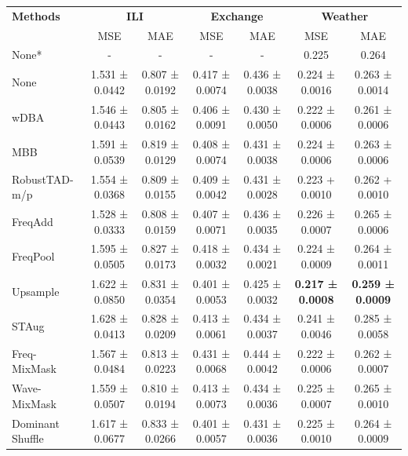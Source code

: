 \begin{table}[h!]
\centering
\vspace{0.2cm}
\renewcommand{\arraystretch}{1.2}
\begin{adjustbox}{max width=\textwidth}
\begin{tabular}{l|cc|cc|cc}
    \toprule
    \textbf{Methods} & \multicolumn{2}{c|}{\textbf{ILI}} & \multicolumn{2}{c|}{\textbf{Exchange}} & \multicolumn{2}{c}{\textbf{Weather}} \\
    & MSE & MAE & MSE & MAE & MSE & MAE \\
    \midrule
    None*        & - & - & - & - & 0.225 & 0.264 \\
    None         & 1.531 ± 0.0442 & 0.807 ± 0.0192 & 0.417 ± 0.0074 & 0.436 ± 0.0038 & 0.224 ± 0.0016 & 0.263 ± 0.0014 \\
    wDBA         & 1.546 ± 0.0443 & \cellcolor{secondcolor}0.805 ± 0.0162 & 0.406 ± 0.0091 & 0.430 ± 0.0050 & 0.222 ± 0.0006 & 0.261 ± 0.0006 \\
    MBB          & 1.591 ± 0.0539 & 0.819 ± 0.0129 & 0.408 ± 0.0074 & 0.431 ± 0.0038 & 0.224 ± 0.0006 & 0.263 ± 0.0006 \\
    RobustTAD-m/p & 1.554 ± 0.0368 & 0.809 ± 0.0155 & 0.409 ± 0.0042 & 0.431 ± 0.0028 & 0.223 + 0.0010 & 0.262 + 0.0010 \\
    FreqAdd      & \cellcolor{secondcolor}1.528 ± 0.0333 & 0.808 ± 0.0159 & 0.407 ± 0.0071 & 0.436 ± 0.0035 & 0.226 ± 0.0007 & 0.265 ± 0.0006 \\
    FreqPool     & 1.595 ± 0.0505 & 0.827 ± 0.0173 & 0.418 ± 0.0032 & 0.434 ± 0.0021 & 0.224 ± 0.0009 & 0.264 ± 0.0011 \\
    Upsample     & 1.622 ± 0.0850 & 0.831 ± 0.0354 & \cellcolor{secondcolor}0.401 ± 0.0053 & \cellcolor{secondcolor}0.425 ± 0.0032 & \cellcolor{bestcolor}\textbf{0.217 ± 0.0008} & \cellcolor{bestcolor}\textbf{0.259 ± 0.0009} \\
    STAug        & 1.628 ± 0.0413 & 0.828 ± 0.0209 & 0.413 ± 0.0061 & 0.434 ± 0.0037 & 0.241 ± 0.0046 & 0.285 ± 0.0058 \\
    Freq-MixMask & 1.567 ± 0.0484 & 0.813 ± 0.0223 & 0.431 ± 0.0068 & 0.444 ± 0.0042 & 0.222 ± 0.0006 & 0.262 ± 0.0007 \\
    Wave-MixMask & 1.559 ± 0.0507 & 0.810 ± 0.0194 & 0.413 ± 0.0073 & 0.434 ± 0.0036 & 0.225 ± 0.0007 & 0.265 ± 0.0010 \\
    Dominant Shuffle  & 1.617 ± 0.0677 & 0.833 ± 0.0266 & 0.401 ± 0.0057 & 0.431 ± 0.0036 & 0.225 ± 0.0010 & 0.264 ± 0.0009 \\

\end{tabular}
\end{adjustbox}
\end{table}
